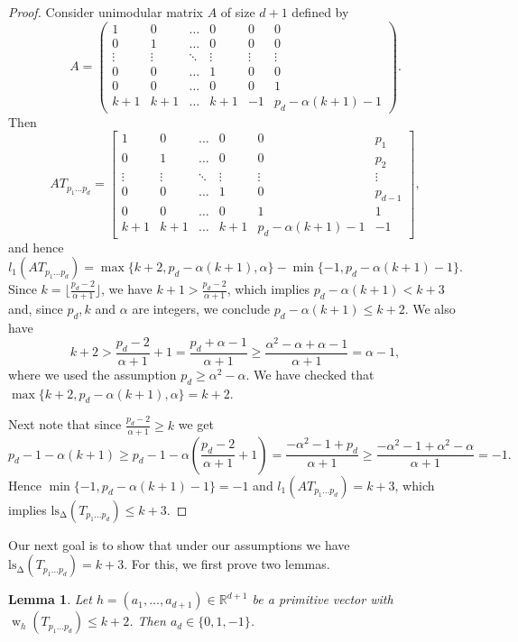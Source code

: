 \documentclass[11pt]{amsart}
\numberwithin{equation}{section}
\theoremstyle{plain}
\newtheorem{Lemma}[Theorem]{Lemma}
\theoremstyle{definition}
\newcommand{\R}{\mathbb R}
\newcommand{\w}{\operatorname{w}}
\newcommand{\ls}{\operatorname{ls_\Delta}}
\begin{document}
\begin{proof} 
Consider unimodular matrix $A$ of size $d+1$ defined by
$$A=\left(\begin{matrix}
1&0&\dots&0&0&0\\
0&1&\dots&0&0&0\\
\vdots&\vdots &\ddots&\vdots&\vdots&\vdots\\
0&0&\dots&1&0&0\\
0&0&\dots&0&0&1\\
k+1&k+1&\dots&k+1&-1&p_d-\alpha(k+1)-1
\end{matrix}\right).
$$ 
Then 
$$AT_{p_1 \dots p_d}=\begin{bmatrix}
1&0&\dots&0&0&p_1\\
0&1&\dots&0&0&p_2\\
\vdots&\vdots &\ddots&\vdots&\vdots&\vdots\\
0&0&\dots&1&0&p_{d-1}\\
0&0&\dots&0&1&1\\
k+1&k+1&\dots&k+1&p_d-\alpha(k+1)-1&-1
\end{bmatrix},
$$ 
and hence 
$$l_1(AT_{p_1\dots p_d})=\max\{k+2,p_d-\alpha(k+1),\alpha\}-\min\{-1,p_d-\alpha(k+1)-1\}.$$
Since $k=\lfloor\frac{p_d-2}{\alpha+1}\rfloor$, we have $k+1>\frac{p_d-2}{\alpha+1}$, which implies $p_d-\alpha(k+1)< k+3$ and, since $p_d, k$ and $\alpha$ are integers, we 
conclude $p_d-\alpha(k+1)\leq k+2$. We also have
$$k+2>\frac{p_d-2}{\alpha+1}+1=\frac{p_d+\alpha-1}{\alpha+1}\geq \frac{\alpha^2-\alpha+\alpha-1}{\alpha+1}=\alpha-1,
$$
where  we used the assumption $p_d\geq \alpha^2-\alpha$. We have checked that $\max\{k+2,p_d-\alpha(k+1),\alpha\}=k+2$.

Next note that since $\frac{p_d-2}{\alpha+1}\geq k$ we get
$$p_d-1-\alpha(k+1)\geq p_d-1-\alpha\left(\frac{p_d-2}{\alpha+1}+1\right)=\frac{-\alpha^2-1+p_d}{\alpha+1}\geq\frac{-\alpha^2-1+\alpha^2-\alpha}{\alpha+1}=-1.
$$
Hence $\min\{-1,p_d-\alpha(k+1)-1\}=-1$ and $l_1(AT_{p_1 \dots p_d})=k+3$, which implies $\ls(T_{p_1 \dots p_d})\leq k+3$.
\end{proof}

Our next goal is to show that under our assumptions we have $\ls(T_{p_1\dots p_d})=k+3$. For this, we first prove two lemmas.

\begin{Lemma}\label{L:Lemma1} Let $h=(a_1,\dots, a_{d+1})\in\R^{d+1}$ be a primitive vector with $\w_{h}(T_{p_1\dots p_d})\leq k+2$.
Then $a_d\in\{0,1,-1\}$.
\end{Lemma}
\end{document}
